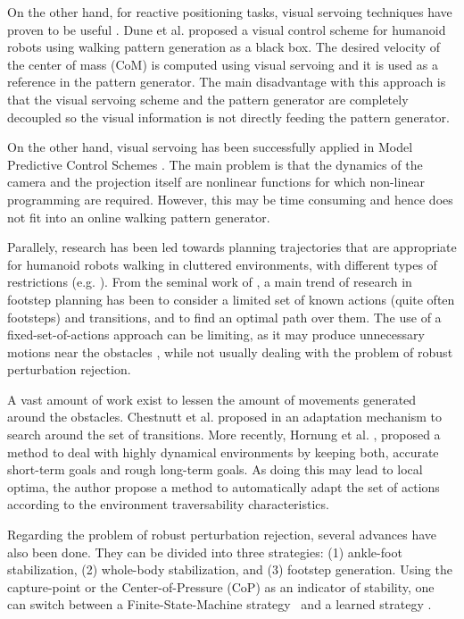 On the other hand, for reactive positioning tasks, visual servoing techniques have proven to be useful \citep{ChaumetteRAM2006, ChaumetteRAM2007}. Dune et al. \citep{DuneIROS2010} proposed a visual control scheme for humanoid robots using walking pattern generation as a black box. The desired velocity of the center of mass (CoM) is computed using visual servoing and it is used as a reference in the pattern generator. The main disadvantage with this approach is that the visual servoing scheme and the pattern generator are completely decoupled so the visual information is not directly feeding the pattern generator.

On the other hand, visual servoing has been successfully applied in Model Predictive Control Schemes \citep{Allibert2010}. The main problem is that the dynamics of the camera and the projection itself are nonlinear functions for which non-linear programming are required. However, this may be time consuming and hence does not fit into an online walking pattern generator.

Parallely, research has been led towards planning trajectories that are appropriate for humanoid robots walking in cluttered environments, with different types of restrictions (e.g. \citep{Chestnutt2005, jib-IJHR2010}). 
From the seminal work of \citep{Chestnutt2005}, a main trend of research in footstep planning has been to consider a limited set of known actions (quite often footsteps) and transitions, and to find an optimal path over them. The use of a fixed-set-of-actions approach can be limiting, as it may produce unnecessary motions near the obstacles \citep{Bourgeot:IROS:2002}, while not usually dealing with the problem of robust perturbation rejection. 

A vast amount of work exist to lessen the amount of movements generated around the obstacles. Chestnutt et al. proposed in \citep{Chestnutt:ICRA:2007} an adaptation mechanism to search around the set of transitions. More recently, Hornung et al. \citep{Hornung:ICRA:2012}, proposed a method to deal with highly dynamical environments by keeping both, accurate short-term goals and rough long-term goals. As doing this may lead to local optima, the author propose a method to automatically adapt the set of actions according to the environment traversability characteristics. 

Regarding the problem of robust perturbation rejection, several advances have also been done. They can be divided into three strategies: (1) ankle-foot stabilization, (2) whole-body stabilization, and (3) footstep generation. 
Using the capture-point or the Center-of-Pressure (CoP) as an indicator of stability, one can switch between a Finite-State-Machine strategy~\citep{Nishiwaki:ijrr:2009} and a learned strategy \citep{SeungJoon:ichr:2011}.

